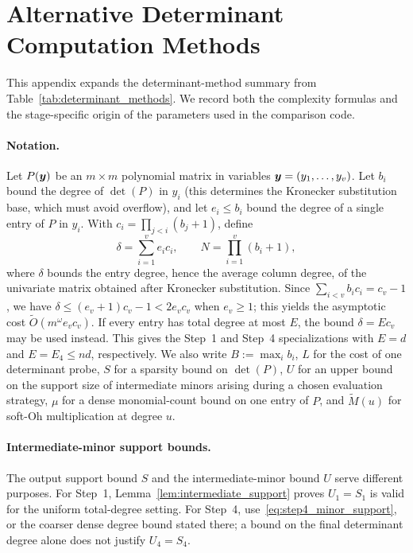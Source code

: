 \newpage
\section{Alternative Determinant Computation Methods}\label{appendix:determinant_methods}

This appendix expands the determinant-method summary from Table~\ref{tab:determinant_methods}. We record both the complexity formulas and the stage-specific origin of the parameters used in the comparison code.

\paragraph{Notation.}
Let $P({\boldsymbol{y}})$ be an $m\times m$ polynomial matrix in variables ${\boldsymbol{y}}=(y_1,\ldots,y_v)$. Let $b_i$ bound the degree of $\det(P)$ in $y_i$ (this determines the Kronecker substitution base, which must avoid overflow), and let $e_i\le b_i$ bound the degree of a single entry of $P$ in $y_i$. With $c_i=\prod_{j<i}(b_j+1)$, define
\[
\delta = \sum_{i=1}^{v}e_i c_i,
\qquad
N = \prod_{i=1}^{v}(b_i+1),
\]
where $\delta$ bounds the entry degree, hence the average column degree, of the univariate matrix obtained after Kronecker substitution. Since $\sum_{i<v}b_i c_i=c_v-1$, we have $\delta\le(e_v+1)c_v-1<2e_vc_v$ when $e_v\ge1$; this yields the asymptotic cost $\widetilde{O}(m^\omega e_vc_v)$. If every entry has total degree at most $E$, the bound $\delta=Ec_v$ may be used instead. This gives the Step~1 and Step~4 specializations with $E=d$ and $E=E_4\le nd$, respectively.
We also write $B:=\max_i b_i$, $L$ for the cost of one determinant probe, $S$ for a sparsity bound on $\det(P)$, $U$ for an upper bound on the support size of intermediate minors arising during a chosen evaluation strategy, $\mu$ for a dense monomial-count bound on one entry of $P$, and $\widetilde{M}(u)$ for soft-Oh multiplication at degree $u$.

\paragraph{Intermediate-minor support bounds.}
The output support bound $S$ and the intermediate-minor bound $U$ serve different purposes. For Step~1, Lemma~\ref{lem:intermediate_support} proves $U_1=S_1$ is valid for the uniform total-degree setting. For Step~4, use~\eqref{eq:step4_minor_support}, or the coarser dense degree bound stated there; a bound on the final determinant degree alone does not justify $U_4=S_4$.


